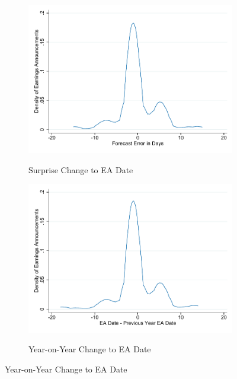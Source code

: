 \newpage \clearpage


\begin{figure}[ht]
    \begin{center}
    \caption{Distribution of Shifts to Earnings Announcements} \label{fig:EA_Shifts}
    \begin{subfigure}[t]{0.8\textwidth}
        \caption{Surprise Change to EA Date}
        \centering
        \includegraphics[width=\linewidth]{Figures/Date_Diff_w.pdf}  \label{fig:EA_Shifts_Surprise}
    \end{subfigure}
    \hfill
    \begin{subfigure}[t]{0.8\textwidth}
        \caption{Year-on-Year Change to EA Date}
    \centering
        \includegraphics[width=\linewidth]{Figures/Doy_Diff.pdf}  \label{fig:EA_Shifts_YoY}
    \end{subfigure}
    \end{center}
\end{figure}




